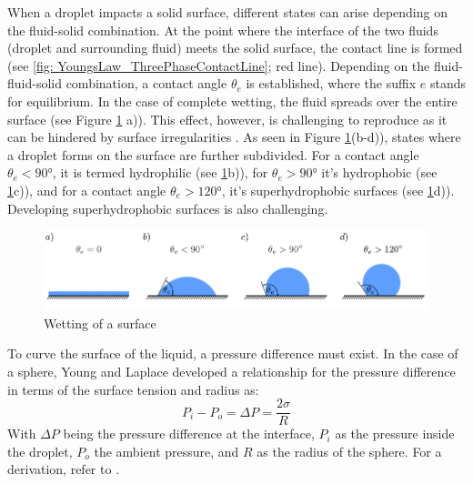 When a droplet impacts a solid surface, different states can arise depending on the fluid-solid combination. At the point where the interface of the two fluids (droplet and surrounding fluid) meets the solid surface, the contact line is formed (see \ref{fig: YoungsLaw_ThreePhaseContactLine}; red line). Depending on the fluid-fluid-solid combination, a contact angle $\theta_e$ is established, where the suffix $e$ stands for equilibrium. In the case of complete wetting, the fluid spreads over the entire surface (see Figure \ref{fig: WettingTheory_WettingOfSurface} a)). This effect, however, is challenging to reproduce as it can be hindered by surface irregularities . As seen in Figure \ref{fig: WettingTheory_WettingOfSurface}(b-d)), states where a droplet forms on the surface are further subdivided. For a contact angle $\theta_e<90°$, it is termed hydrophilic (see \ref{fig: WettingTheory_WettingOfSurface}b)), for $\theta_e>90°$ it's hydrophobic (see \ref{fig: WettingTheory_WettingOfSurface}c)), and for a contact angle $\theta_e>120°$, it's superhydrophobic surfaces (see \ref{fig: WettingTheory_WettingOfSurface}d)). Developing superhydrophobic surfaces is also challenging.
\begin{figure}[h]
    \centering
    \includegraphics[width=.95\textwidth]{Pictures/DropletsAndWetting.pdf}
    \caption{Wetting of a surface}
    \label{fig: WettingTheory_WettingOfSurface}
\end{figure}
To curve the surface of the liquid, a pressure difference must exist. In the case of a sphere, Young and Laplace developed a relationship for the pressure difference in terms of the surface tension and radius as:
\begin{equation}
\label{eq: YoungLaplaceEQ}
    P_i - P_o = \Delta P =  \frac{2\sigma}{R}
\end{equation}
With $\Delta P$ being the pressure difference at the interface, $P_i$ as the pressure inside the droplet, $P_o$ the ambient pressure, and $R$ as the radius of the sphere. For a derivation, refer to \cite{buttPhysicsChemistryInterfaces}.


